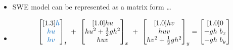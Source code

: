 \begin{frame}
\begin{minipage}{0.35\textwidth}
\begin{itemize}
\item<1->[] SWE model can be represented as a matrix form \dots
\item<1->[]
\begin{align*}
\vspace{-15pt}
&\begin{bmatrix}[1.3]
\myTUMdarkblue{h}\\
\myTUMdarkblue{hu}\\
\myTUMdarkblue{hv}\\
\end{bmatrix}_t \ + \
\begin{bmatrix}[1.0]
hu\\
hu^2 + \frac{1}{2}gh^2\\
huv\\
\end{bmatrix}_x\ + \
\begin{bmatrix}[1.0]
hv\\
huv\\
hv^2 + \frac{1}{2}gh^2\\
\end{bmatrix}_y =
\begin{bmatrix}[1.0]
0\\
-gh\ b_x\\
-gh\ b_y
\end{bmatrix}\\[2em]

\end{align*}
\end{itemize}
\end{minipage}
\end{frame}
